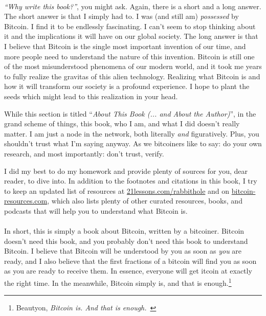 \paragraph{}
\textit{\enquote{Why write this book?}}, you might
ask. Again, there is a short and a long answer. The short answer is that I
simply had to. I was (and still am) \textit{possessed} by Bitcoin. I find it to
be endlessly fascinating. I can't seem to stop thinking about it and the
implications it will have on our global society. The long answer is that I
believe that Bitcoin is the single most important invention of our time, and
more people need to understand the nature of this invention. Bitcoin is
still one of the most misunderstood phenomena of our modern world, and it took
me years to fully realize the gravitas of this alien technology. Realizing what
Bitcoin is and how it will transform our society is a profound experience. I
hope to plant the seeds which might lead to this realization in your head.

While this section is titled \enquote{\textit{About This Book (... and About the
Author)}}, in the grand scheme of things, this book, who I am, and what I did
doesn't really matter. I am just a node in the network, both literally
\textit{and} figuratively. Plus, you shouldn't trust what I'm saying anyway. As
we bitcoiners like to say: do your own research, and most importantly: don't
trust, verify.

I did my best to do my homework and provide plenty of sources for you, dear
reader, to dive into. In addition to the footnotes and citations in this book, I
try to keep an updated list of resources at
\href{https://21lessons.com/rabbithole}{21lessons.com/rabbithole} and on
\href{https://bitcoin-resources.com}{bitcoin-resources.com}, which also lists
plenty of other curated resources, books, and podcasts that will help you to
understand what Bitcoin is.

\paragraph{}
In short, this is simply a book about Bitcoin, written by a bitcoiner.
Bitcoin doesn't need this book, and you probably don't need this book to
understand Bitcoin. I believe that Bitcoin will be understood by you as soon as
\textit{you} are ready, and I also believe that the first fractions of a bitcoin
will find you as soon as you are ready to receive them. In essence, everyone
will get \bitcoinB{}itcoin at exactly the right time. In the meanwhile, Bitcoin
simply is, and that is enough.\footnote{Beautyon, \textit{Bitcoin is. And that
is enough.}~\cite{bitcoin-is}}

